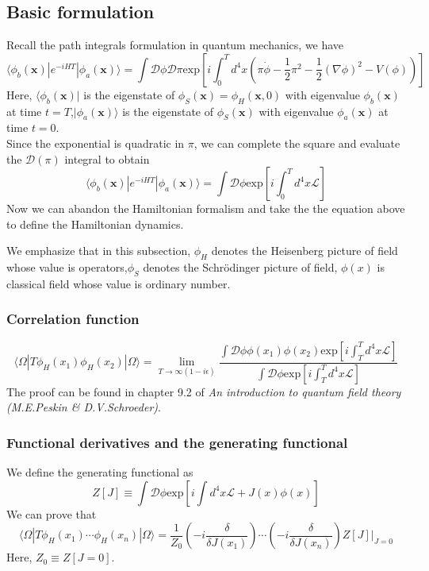 \subsection{Basic formulation}
\noindent
Recall the path integrals formulation in quantum mechanics, we have
\[\langle \phi_b(\bm{x}) | e^{-iHT} | \phi_a(\bm{x}) \rangle = \int \mathcal{D}\phi \mathcal{D}\pi  \mathrm{exp} \left[ i\int_0^T d^4x (\pi\dot{\phi} - \frac{1}{2}\pi^2 - \frac{1}{2}(\nabla \phi)^2 -V(\phi))\right]\]
Here, $\langle \phi_b(\bm{x}) |$ is the eigenstate of $\phi_S(\bm{x})=\phi_H(\bm{x},0)$ with eigenvalue $\phi_b(\bm{x})$ at time $t=T$,$| \phi_a(\bm{x}) \rangle$ is the eigenstate of $\phi_S(\bm{x})$ with eigenvalue $\phi_a(\bm{x})$ at time $t=0$.\\
Since the exponential is quadratic in $\pi$, we can complete the square and evaluate the $\mathcal{D}(\pi)$ integral to obtain
\[\langle \phi_b(\bm{x}) | e^{-iHT} | \phi_a(\bm{x}) \rangle = \int \mathcal{D}\phi  \mathrm{exp} \left[ i\int_0^T d^4x \mathcal{L} \right]\]
Now we can abandon the Hamiltonian formalism and take the the equation above to define the Hamiltonian dynamics.
\begin{note}
We emphasize that in this subsection, $\phi_H$ denotes the Heisenberg picture of field whose value is operators,$\phi_S$ denotes the Schr\"{o}dinger picture of field, $\phi(x)$ is classical field whose value is ordinary number.
\end{note}

\subsubsection{Correlation function}
\[\langle \Omega | T \phi_H(x_1) \phi_H(x_2)| \Omega \rangle = \lim_{T \to \infty(1-i\epsilon)} \frac{\int \mathcal{D}\phi \phi(x_1)\phi(x_2) \mathrm{exp} \left[ i\int_T^T d^4x \mathcal{L} \right]}{\int \mathcal{D} \phi \mathrm{exp} \left[ i\int_T^T d^4x \mathcal{L} \right]}\]
The proof can be found in chapter 9.2 of \emph{An introduction to quantum field theory (M.E.Peskin \& D.V.Schroeder)}.

\subsubsection{Functional derivatives and the generating functional}
\noindent
We define the generating functional as
\[Z[J] \equiv \int \mathcal{D} \phi \mathrm{exp} \left[ i\int d^4x \mathcal{L} + J(x)\phi(x) \right]\]
We can prove that
\[\langle \Omega | T \phi_H(x_1) \cdots \phi_H(x_n) | \Omega \rangle = \frac{1}{Z_0} \left( -i\frac{\delta}{\delta J(x_1)} \right)\cdots \left( -i\frac{\delta}{\delta J(x_n)} \right) Z[J]|_{J=0}\]
Here, $Z_0 \equiv Z[J=0]$.

